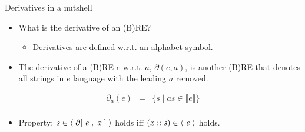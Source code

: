 \documentclass{beamer}
\newcommand{\D}[1]{\blue{\mathsf{#1}}}
\newcommand{\C}[1]{\red{\mathsf{#1}}}
\newcommand{\F}[1]{\green{\mathsf{#1}}}
\newcommand{\V}[1]{\purple{\mathit{#1}}}
\newcommand{\sembrack}[1]{\ensuremath{\llbracket #1 \rrbracket}}
\begin{document}
   \begin{frame}{Derivatives in a nutshell}
     \begin{itemize}
       \item What is the derivative of an (B)RE?
       \begin{itemize}
         \item Derivatives are defined w.r.t. an alphabet symbol.
       \end{itemize}
       \item The derivative of a (B)RE $e$ w.r.t. $a$, $\partial(e,a)$, is another (B)RE that denotes
             all strings in $e$ language with the leading $a$ removed.
     \end{itemize}
     \[
     \begin{array}{lclr}
       \partial_a(e) & = & \{ s \mid as \in \sembrack{e} \}\\
     \end{array}
     \]
     \begin{itemize}
       \item Property: \ensuremath{\V{s}\;\D{\in\langle}\;\F{\partial[}\;\V{e}\;\red{,}\,\;\V{x}\;\F{]}\;\D{\rangle}} holds iff \ensuremath{(\V{x}\;\C{::}\;\V{s})\;\D{\in\langle}\;\V{e}\;\D{\rangle}} holds.
     \end{itemize}
   \end{frame}
\end{document}
